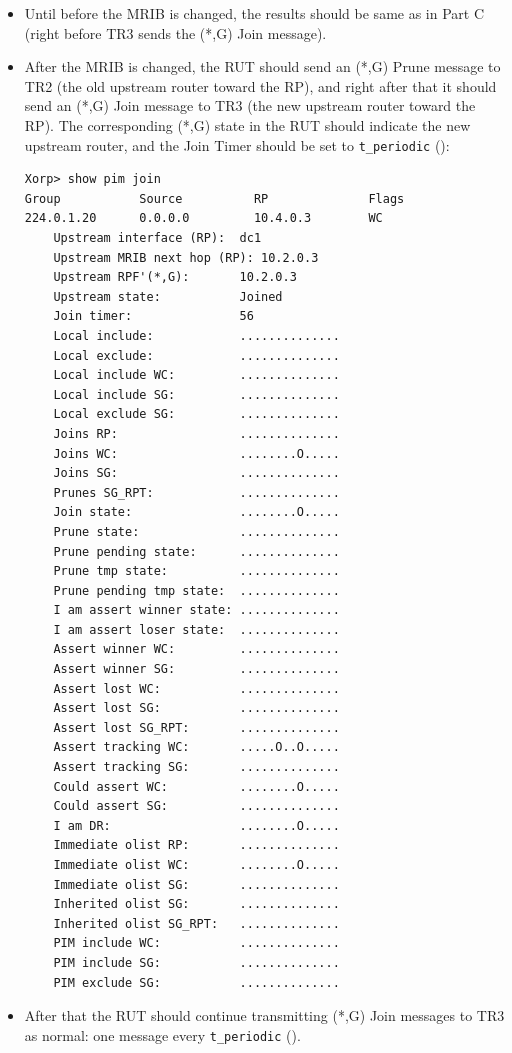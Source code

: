 \documentclass[11pt]{report}
\begin{document}
\begin{itemize}

  \item Until before the MRIB is changed, the results should
  be same as in Part C (right before TR3 sends the (*,G) Join message).

  \item After the MRIB is changed, the RUT should send an (*,G) Prune
  message to TR2 (the old upstream router toward the RP), and right after that
  it should send an (*,G) Join message to TR3 (the new upstream router
  toward the RP). The corresponding (*,G) state in the RUT should
  indicate the new upstream router, and the Join Timer should be set
  to \verb=t_periodic= ({\PimsmTPeriodic}):

\begin{verbatim}
Xorp> show pim join 
Group           Source          RP              Flags
224.0.1.20      0.0.0.0         10.4.0.3        WC   
    Upstream interface (RP):  dc1
    Upstream MRIB next hop (RP): 10.2.0.3
    Upstream RPF'(*,G):       10.2.0.3
    Upstream state:           Joined 
    Join timer:               56
    Local include:            ..............
    Local exclude:            ..............
    Local include WC:         ..............
    Local include SG:         ..............
    Local exclude SG:         ..............
    Joins RP:                 ..............
    Joins WC:                 ........O.....
    Joins SG:                 ..............
    Prunes SG_RPT:            ..............
    Join state:               ........O.....
    Prune state:              ..............
    Prune pending state:      ..............
    Prune tmp state:          ..............
    Prune pending tmp state:  ..............
    I am assert winner state: ..............
    I am assert loser state:  ..............
    Assert winner WC:         ..............
    Assert winner SG:         ..............
    Assert lost WC:           ..............
    Assert lost SG:           ..............
    Assert lost SG_RPT:       ..............
    Assert tracking WC:       .....O..O.....
    Assert tracking SG:       ..............
    Could assert WC:          ........O.....
    Could assert SG:          ..............
    I am DR:                  ........O.....
    Immediate olist RP:       ..............
    Immediate olist WC:       ........O.....
    Immediate olist SG:       ..............
    Inherited olist SG:       ..............
    Inherited olist SG_RPT:   ..............
    PIM include WC:           ..............
    PIM include SG:           ..............
    PIM exclude SG:           ..............
\end{verbatim}

  \item After that the RUT should continue transmitting 
  (*,G) Join messages to TR3 as normal: one message every \verb=t_periodic=
  ({\PimsmTPeriodic}).

\end{itemize}
\end{document}
